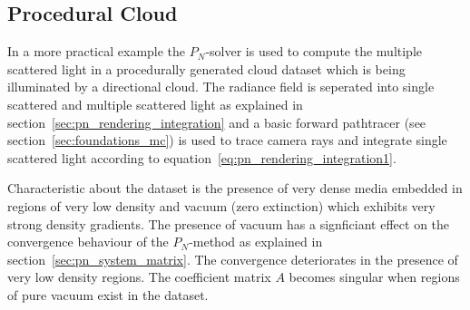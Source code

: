 \subsection{Procedural Cloud}
\label{sec:pn_results_clouds}

In a more practical example the $P_N$-solver is used to compute the multiple scattered light in a procedurally generated cloud dataset which is being illuminated by a directional cloud. The radiance field is seperated into single scattered and multiple scattered light as explained in section~\ref{sec:pn_rendering_integration} and a basic forward pathtracer (see section~\ref{sec:foundations_mc}) is used to trace camera rays and integrate single scattered light according to equation~\ref{eq:pn_rendering_integration1}.

Characteristic about the dataset is the presence of very dense media embedded in regions of very low density and vacuum (zero extinction) which exhibits very strong density gradients. The presence of vacuum has a signficiant effect on the convergence behaviour of the $P_N$-method as explained in section~\ref{sec:pn_system_matrix}. The convergence deteriorates in the presence of very low density regions. The coefficient matrix $A$ becomes singular when regions of pure vacuum exist in the dataset.

